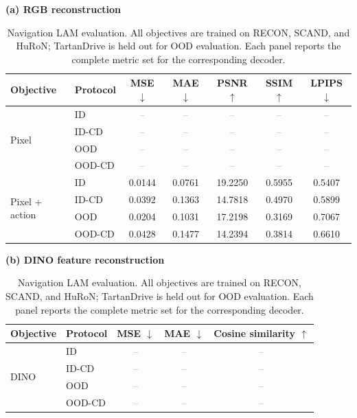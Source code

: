 \documentclass{article}
\newcommand{\TBD}{\textcolor{gray}{--}}
\begin{document}
\begin{table}[t]
  \caption{Navigation LAM evaluation. All objectives are trained on RECON,
  SCAND, and HuRoN; TartanDrive is held out for OOD evaluation. Each panel
  reports the complete metric set for the corresponding decoder.}
  \label{tab:lam_objectives}
  \centering
  \scriptsize
  \setlength{\tabcolsep}{5pt}
  \renewcommand{\arraystretch}{0.98}

  \textbf{(a) RGB reconstruction}\par\vspace{2pt}
  \begin{tabular}{ll ccccc}
    \toprule
    Objective & Protocol & MSE $\downarrow$ & MAE $\downarrow$
    & PSNR $\uparrow$ & SSIM $\uparrow$ & LPIPS $\downarrow$ \\
    \midrule
    \multirow{4}{*}{Pixel}
    & ID & \TBD & \TBD & \TBD & \TBD & \TBD \\
    & ID-CD & \TBD & \TBD & \TBD & \TBD & \TBD \\
    & OOD & \TBD & \TBD & \TBD & \TBD & \TBD \\
    & OOD-CD & \TBD & \TBD & \TBD & \TBD & \TBD \\
    \midrule
    \multirow{4}{*}{Pixel + action}
    & ID & 0.0144 & 0.0761 & 19.2250 & 0.5955 & 0.5407 \\
    & ID-CD & 0.0392 & 0.1363 & 14.7818 & 0.4970 & 0.5899 \\
    & OOD & 0.0204 & 0.1031 & 17.2198 & 0.3169 & 0.7067 \\
    & OOD-CD & 0.0428 & 0.1477 & 14.2394 & 0.3814 & 0.6610 \\
    \bottomrule
  \end{tabular}

  \vspace{7pt}
  \textbf{(b) DINO feature reconstruction}\par\vspace{2pt}
  \begin{tabular}{ll ccc}
    \toprule
    Objective & Protocol & MSE $\downarrow$ & MAE $\downarrow$
    & Cosine similarity $\uparrow$ \\
    \midrule
    \multirow{4}{*}{DINO}
    & ID & \TBD & \TBD & \TBD \\
    & ID-CD & \TBD & \TBD & \TBD \\
    & OOD & \TBD & \TBD & \TBD \\
    & OOD-CD & \TBD & \TBD & \TBD \\
    \bottomrule
  \end{tabular}


\end{table}
\end{document}
